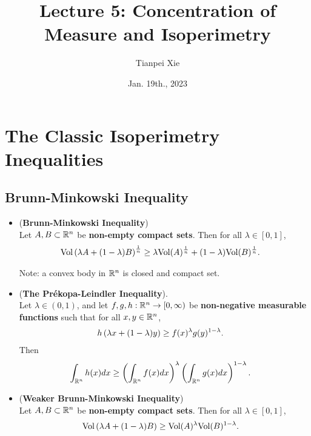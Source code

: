 \documentclass[11pt]{article}
\begin{document}
\title{Lecture 5: Concentration of Measure and Isoperimetry}
\author{ Tianpei Xie}
\date{Jan. 19th., 2023 }
\maketitle
\tableofcontents
\newpage
\section{The Classic Isoperimetry Inequalities}
\subsection{Brunn-Minkowski Inequality}
\begin{itemize}
\item \begin{theorem} (\textbf{Brunn-Minkowski Inequality}) \citep{boucheron2013concentration, vershynin2018high, wainwright2019high}\\
Let $A, B \subset {\mathbb R}^n$ be \textbf{non-empty compact sets}. Then for all $\lambda \in [0, 1]$,
\begin{align}
\text{Vol}\left( \lambda A + (1- \lambda) B \right)^{\frac{1}{n}} &\ge \lambda\text{Vol}(A)^{\frac{1}{n}} + (1- \lambda)\text{Vol}(B)^{\frac{1}{n}}.   \label{ineqn: brunn_minkowski_inequality}
\end{align}
\end{theorem}
Note:  a convex body in ${\mathbb R}^n$ is closed and compact set.

\item \begin{theorem} (\textbf{The Pr{\'e}kopa-Leindler Inequality}). \citep{boucheron2013concentration, wainwright2019high} \\
Let $\lambda \in (0, 1)$, and let $f, g, h : {\mathbb R}^n \to [0, \infty)$ be \textbf{non-negative measurable functions} such that for all $x, y \in {\mathbb R}^n$,
\begin{align*}
h\left(\lambda x + (1- \lambda) y\right) &\ge f(x)^{\lambda}g(y)^{1-\lambda}.
\end{align*} Then
\begin{align}
\int_{{\mathbb R}^n} h(x) dx &\ge \left(\int_{{\mathbb R}^n} f(x) dx \right)^{\lambda}\left(\int_{{\mathbb R}^n} g(x) dx\right)^{1-\lambda}.   \label{ineqn: prekopa_leindler_inequality}
\end{align}
\end{theorem}

\item \begin{corollary} (\textbf{Weaker Brunn-Minkowski Inequality}) \citep{boucheron2013concentration, wainwright2019high}\\
Let $A, B \subset {\mathbb R}^n$ be \textbf{non-empty compact sets}. Then for all $\lambda \in [0, 1]$,
\begin{align}
\text{Vol}\left( \lambda A + (1- \lambda) B \right) &\ge \text{Vol}(A)^{\lambda}\text{Vol}(B)^{1- \lambda}.   \label{ineqn: brunn_minkowski_inequality_weaker}
\end{align}
\end{corollary}
\end{itemize}
\end{document}
